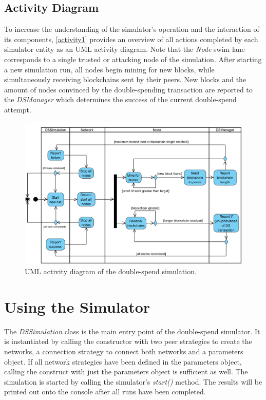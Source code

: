 \documentclass[a4paper,12pt,twoside]{report}
\begin{document}
\subsection{Activity Diagram}
To increase the understanding of the simulator's operation and the interaction of its components, \autoref{activity1} provides an overview of all actions completed by each simulator entity as an UML activity diagram. Note that the \textit{Node} swim lane corresponds to a single trusted or attacking node of the simulation. After starting a new simulation run, all nodes begin mining for new blocks, while simultaneously receiving blockchains sent by their peers. New blocks and the amount of nodes convinced by the double-spending transaction are reported to the \textit{DSManager} which determines the success of the current double-spend attempt.
\begin{figure}[ht]
	\centering
  \includegraphics[width=\textwidth]{Activity1.png}
	\caption{UML activity diagram of the double-spend simulation.}
	\label{activity1}
\end{figure}

\section{Using the Simulator} \label{usage}
The \textit{DSSimulation} class is the main entry point of the double-spend simulator. It is instantiated by calling the constructor with two peer strategies to create the networks, a connection strategy to connect both networks and a parameters object. If all network strategies have been defined in the parameters object, calling the construct with just the parameters object is sufficient as well. The simulation is started by calling the simulator's \textit{start()} method. The results will be printed out onto the console after all runs have been completed. 
\end{document}
